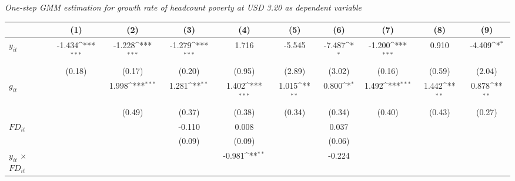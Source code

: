 \documentclass[12pt, a4paper]{article}
\begin{document}
\begin{appendices}
\begin{table}[htbp]
\begin{threeparttable}
\begin{tablenotes}
		\end{tablenotes}
	\end{threeparttable}
	\caption[One-Step System-GMM Estimation Results for Headcount Poverty at USD 3.20]{\textit{One-step GMM estimation for growth rate of headcount poverty at USD 3.20 as dependent variable}}
	\label{1GMM320full}
\end{table}

	\begin{table}[htbp]
	\centering
	\scriptsize
	\setlength\tabcolsep{1pt}	
	\begin{threeparttable}
		{
			\def\sym#1{\ifmmode^{#1}\else\(^{#1}\)\fi}
			\begin{tabular}{l*{9}{c}}
				\hline\hline
				&\multicolumn{1}{c}{(1)}&\multicolumn{1}{c}{(2)}&\multicolumn{1}{c}{(3)}&\multicolumn{1}{c}{(4)}&\multicolumn{1}{c}{(5)}&\multicolumn{1}{c}{(6)}&\multicolumn{1}{c}{(7)}&\multicolumn{1}{c}{(8)}&\multicolumn{1}{c}{(9)}\\
				\hline
				$y_{it}$               &      -1.434\sym{***}&      -1.228\sym{***}&      -1.279\sym{***}&       1.716         &      -5.545         &      -7.487\sym{*}  &      -1.200\sym{***}&       0.910         &      -4.409\sym{*}  \\
				&      (0.18)         &      (0.17)         &      (0.20)         &      (0.95)         &      (2.89)         &      (3.02)         &      (0.16)         &      (0.59)         &      (2.04)         \\
				$g_{it}$             &                     &       1.998\sym{***}&       1.281\sym{**} &       1.402\sym{***}&       1.015\sym{**} &       0.800\sym{*}  &       1.492\sym{***}&       1.442\sym{**} &       0.878\sym{**} \\
				&                     &      (0.49)         &      (0.37)         &      (0.38)         &      (0.34)         &      (0.34)         &      (0.40)         &      (0.43)         &      (0.27)         \\
				$FD_{it}$               &                     &                     &      -0.110         &       0.008         &                     &       0.037         &                     &                     &                     \\
				&                     &                     &      (0.09)         &      (0.09)         &                     &      (0.06)         &                     &                     &                     \\
				$y_{it}$ $\times$ $FD_{it}$ &                     &                     &                     &      -0.981\sym{**} &                     &      -0.224         &                     &                     &                     \\

\end{tabular}}
\end{threeparttable}
\end{table}
\end{appendices}
\end{document}
